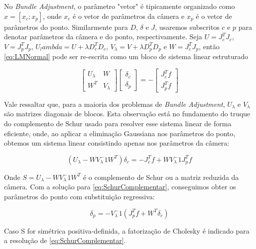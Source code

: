 \begin{itemize}
No \emph{Bundle Adjustment}, o parâmetro "vetor" é tipicamente organizado como $x = [x_c;x_p]$, onde $x_c$ é o vetor de parâmetros da câmera e $x_p$ é o vetor de parâmetros do ponto. Similarmente para $D$, $\delta$ e $J$, usaremos subscritos $c$ e $p$ para denotar parâmetros da câmera e do ponto, respectivamente. 
Seja $U = J_c^T J_c$, $V = J_p^T J_p$, $U_lambda = U + \lambda D_c^T D_c$, $V_\lambda = V + \lambda D_p^T D_p$ e $W = J_c^T J_p$, então \ref{eq:LMNormal} pode ser re-escrita como um bloco de sistema linear estruturado

\[
\begin{bmatrix}
U_\lambda & W \\
W^T & V_\lambda 
\end{bmatrix}
\begin{bmatrix}
\delta_c\\ 
\delta_p
\end{bmatrix} =
-\begin{bmatrix}
J_c^T f\\ 
J_p^T f
\end{bmatrix}
\]

Vale ressaltar que, para a maioria dos problemas de \emph{Bundle Adjustment}, $U_\lambda$ e $V_\lambda$ são matrizes diagonais de blocos. Esta observação está no fundamento do truque do complemento de Schur usado para resolver esse sistema linear de forma eficiente, onde, ao aplicar a eliminação Gaussiana nos parâmetros do ponto, obtemos um sistema linear consistindo apenas nos parâmetros da câmera:

\begin{equation}
\label{eq:SchurComplementar}
(U_\lambda - W V_\lambda^-1 W^T)\delta_c = -J_c^T f + WV_\lambda^-1 J_p^T f
\end{equation}

Onde $S = U_\lambda - W V_\lambda^-1 W^T$ é o complemento de Schur ou a matriz reduzida da câmera. Com a solução para \ref{eq:SchurComplementar}, conseguimos obter os parâmetros do ponto com substituição regressiva:

\begin{equation}
\delta_p = -V_\lambda^-1(J_p^T f + W^T \delta_c)
\end{equation}

Caso S for simétrica positiva-definida, a fatorização de Cholesky é indicado para a resolução de \ref{eq:SchurComplementar}. 

%


\end{itemize}
